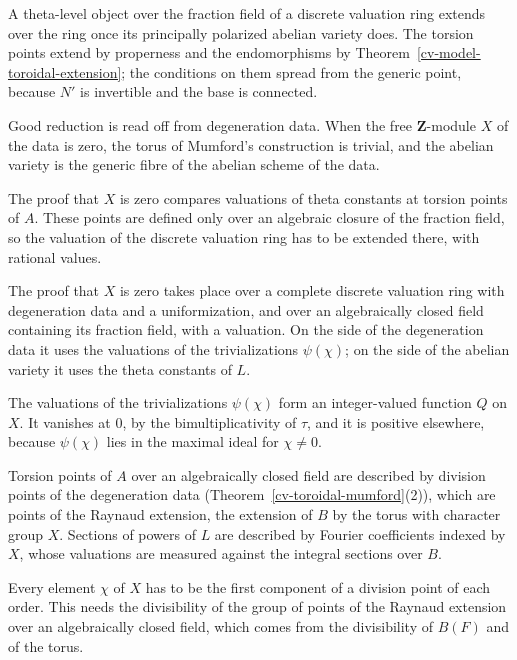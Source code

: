 A theta-level object over the fraction field of a discrete valuation ring extends over the ring once its
principally polarized abelian variety does. The torsion points extend by properness and the
endomorphisms by Theorem~\ref{cv-model-toroidal-extension}; the conditions on them spread from the
generic point, because $N'$ is invertible and the base is connected.

Good reduction is read off from degeneration data. When the free $\mathbf Z$-module $X$ of the data is
zero, the torus of Mumford's construction is trivial, and the abelian variety is the generic fibre of the
abelian scheme of the data.

The proof that $X$ is zero compares valuations of theta constants at torsion points of $A$. These points
are defined only over an algebraic closure of the fraction field, so the valuation of the discrete
valuation ring has to be extended there, with rational values.

The proof that $X$ is zero takes place over a complete discrete valuation ring with degeneration data and
a uniformization, and over an algebraically closed field containing its fraction field, with a valuation.
On the side of the degeneration data it uses the valuations of the trivializations $\psi(\chi)$; on the
side of the abelian variety it uses the theta constants of $L$.

The valuations of the trivializations $\psi(\chi)$ form an integer-valued function $Q$ on $X$. It vanishes
at $0$, by the bimultiplicativity of $\tau$, and it is positive elsewhere, because $\psi(\chi)$ lies in
the maximal ideal for $\chi\ne0$.

Torsion points of $A$ over an algebraically closed field are described by division points of the
degeneration data (Theorem~\ref{cv-toroidal-mumford}(2)), which are points of the Raynaud extension, the
extension of $B$ by the torus with character group $X$. Sections of powers of $L$ are described by Fourier
coefficients indexed by $X$, whose valuations are measured against the integral sections over $B$.

Every element $\chi$ of $X$ has to be the first component of a division point of each order. This needs
the divisibility of the group of points of the Raynaud extension over an algebraically closed field, which
comes from the divisibility of $B(F)$ and of the torus.

